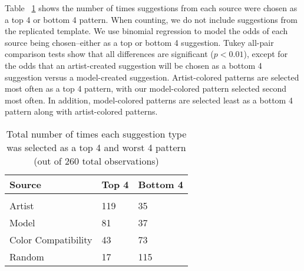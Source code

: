
Table ~\ref{table:study} shows the number of times suggestions from each source were chosen as a top 4 or bottom 4 pattern. When counting, we do not include suggestions from the replicated template. We use binomial regression to model the odds of each source being chosen--either as a top or bottom 4 suggestion. Tukey all-pair comparison tests show that all differences are significant ($p < 0.01$), except for the odds that an artist-created suggestion will be chosen as a bottom 4 suggestion versus a model-created suggestion. Artist-colored patterns are selected most often as a top 4 pattern, with our model-colored pattern selected second most often. In addition, model-colored patterns are selected least as a bottom 4 pattern along with artist-colored patterns.


\begin{table}[h!]
  \begin{center}
\begin{tabular}{l| l l}
  \hline
\textbf{Source} & \textbf{Top 4} & \textbf{Bottom 4} \\
  \hline \\[-1.0em]
Artist & 119 & 35\\
Model & 81 & 37 \\
Color Compatibility & 43 & 73  \\
Random & 17 & 115 \\
\hline
\end{tabular}
\end{center}
\caption{Total number of times each suggestion type was selected as a top 4 and worst 4 pattern (out of 260 total observations)}

 \label{table:study}
\end{table}